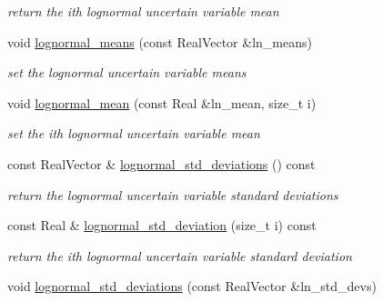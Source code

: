 \begin{DoxyCompactItemize}
\begin{DoxyCompactList}\small\item\em return the ith lognormal uncertain variable mean \end{DoxyCompactList}\item 
void \hyperlink{classPecos_1_1AleatoryDistParams_af88e694961e8441a6afe382cfa02c263}{lognormal\+\_\+means} (const Real\+Vector \&ln\+\_\+means)\label{classPecos_1_1AleatoryDistParams_af88e694961e8441a6afe382cfa02c263}

\begin{DoxyCompactList}\small\item\em set the lognormal uncertain variable means \end{DoxyCompactList}\item 
void \hyperlink{classPecos_1_1AleatoryDistParams_a07cb91f8ed207a06eaa0ae95f1fb8edb}{lognormal\+\_\+mean} (const Real \&ln\+\_\+mean, size\+\_\+t i)\label{classPecos_1_1AleatoryDistParams_a07cb91f8ed207a06eaa0ae95f1fb8edb}

\begin{DoxyCompactList}\small\item\em set the ith lognormal uncertain variable mean \end{DoxyCompactList}\item 
const Real\+Vector \& \hyperlink{classPecos_1_1AleatoryDistParams_a3fa19b7a09efb6ec41b6cd655b362eba}{lognormal\+\_\+std\+\_\+deviations} () const \label{classPecos_1_1AleatoryDistParams_a3fa19b7a09efb6ec41b6cd655b362eba}

\begin{DoxyCompactList}\small\item\em return the lognormal uncertain variable standard deviations \end{DoxyCompactList}\item 
const Real \& \hyperlink{classPecos_1_1AleatoryDistParams_a1cabedb0eab55f7128342ad5186d9efa}{lognormal\+\_\+std\+\_\+deviation} (size\+\_\+t i) const \label{classPecos_1_1AleatoryDistParams_a1cabedb0eab55f7128342ad5186d9efa}

\begin{DoxyCompactList}\small\item\em return the ith lognormal uncertain variable standard deviation \end{DoxyCompactList}\item 
void \hyperlink{classPecos_1_1AleatoryDistParams_a9c3b666c0b78472154f618d5c9959a9a}{lognormal\+\_\+std\+\_\+deviations} (const Real\+Vector \&ln\+\_\+std\+\_\+devs)\label{classPecos_1_1AleatoryDistParams_a9c3b666c0b78472154f618d5c9959a9a}


\end{DoxyCompactItemize}
